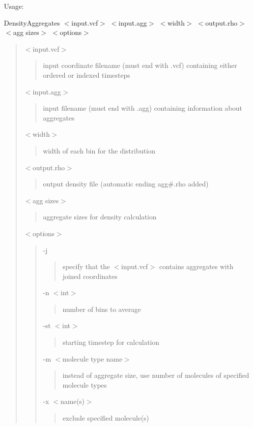 Usage\+:

{\ttfamily Density\+Aggregates $<$input.\+vcf$>$ $<$input.\+agg$>$ $<$width$>$ $<$output.\+rho$>$ $<$agg sizes$>$ $<$options$>$}

\begin{quote}
{\ttfamily $<$input.\+vcf$>$} \begin{quote}
input coordinate filename (must end with {\ttfamily .vcf}) containing either ordered or indexed timesteps \end{quote}
{\ttfamily $<$input.\+agg$>$} \begin{quote}
input filename (must end with {\ttfamily .agg}) containing information about aggregates \end{quote}
{\ttfamily $<$width$>$} \begin{quote}
width of each bin for the distribution \end{quote}
{\ttfamily $<$output.\+rho$>$} \begin{quote}
output density file (automatic ending {\ttfamily agg\#.rho} added) \end{quote}
{\ttfamily $<$agg sizes$>$} \begin{quote}
aggregate sizes for density calculation \end{quote}
{\ttfamily $<$options$>$} \begin{quote}
{\ttfamily -\/j} \begin{quote}
specify that the {\ttfamily $<$input.\+vcf$>$} contains aggregates with joined coordinates \end{quote}
{\ttfamily -\/n $<$int$>$} \begin{quote}
number of bins to average \end{quote}
{\ttfamily -\/st $<$int$>$} \begin{quote}
starting timestep for calculation \end{quote}
{\ttfamily -\/m $<$molecule type name$>$} \begin{quote}
instead of aggregate size, use number of molecules of specified molecule types \end{quote}
{\ttfamily -\/x $<$name(s)$>$} \begin{quote}
exclude specified molecule(s) \end{quote}
\end{quote}
\end{quote}



